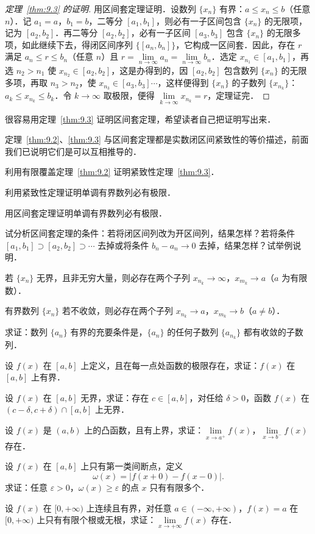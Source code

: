 \begin{proof}[定理~\ref{thm:9.3} 的证明]
用区间套定理证明．设数列 $\{x_n\}$ 有界：$a \leqslant x_n \leqslant b$（任意 $n$）．记 $a_1 = a$，$b_1 = b$，二等分 $[a_1, b_1]$，则必有一子区间包含 $\{x_n\}$ 的无限项，记为 $[a_2, b_2]$．再二等分 $[a_2, b_2]$，必有一子区间 $[a_3, b_3]$ 包含 $\{x_n\}$ 的无限多项，如此继续下去，得闭区间序列 $\{[a_n, b_n]\}$，它构成一区间套．因此，存在 $r$ 满足 $a_n \leqslant r \leqslant b_n$（任意 $n$）且 $r = \lim\limits_{n \to \infty} a_n = \lim\limits_{n \to \infty} b_n$．选定 $x_{n_1} \in [a_1, b_1]$，再选 $n_2 > n_1$ 使 $x_{n_2} \in [a_2, b_2]$，这是办得到的，因 $[a_2, b_2]$ 包含数列 $\{x_n\}$ 的无限多项，再取 $n_3 > n_2$，使 $x_{n_3} \in [a_3, b_3] \cdots$，这样便得到 $\{x_n\}$ 的子数列 $\{x_{n_k}\}$：$a_k \leqslant x_{n_k} \leqslant b_k$．令 $k \to \infty$ 取极限，便得 $\lim\limits_{k \to \infty} x_{n_k} = r$，定理证完．
\end{proof}

很容易用定理~\ref{thm:9.3} 证明区间套定理，希望读者自己把证明写出来．

定理~\ref{thm:9.2}、\ref{thm:9.3} 与区间套定理都是实数闭区间紧致性的等价描述，前面我们已说明它们是可以互相推导的．

\begin{xiti}
\item 利用有限覆盖定理~\ref{thm:9.2} 证明紧致性定理~\ref{thm:9.3}．
\item 利用紧致性定理证明单调有界数列必有极限．
\item 用区间套定理证明单调有界数列必有极限．
\item 试分析区间套定理的条件：若将闭区间列改为开区间列，结果怎样？若将条件 $[a_1, b_1] \supset [a_2, b_2] \supset \cdots$ 去掉或将条件 $b_n - a_n \to 0$ 去掉，结果怎样？试举例说明．
\item 若 $\{x_n\}$ 无界，且非无穷大量，则必存在两个子列 $x_{n_k} \to \infty$，$x_{m_k} \to a$（$a$ 为有限数）．
\item 有界数列 $\{x_n\}$ 若不收敛，则必存在两个子列 $x_{n_k} \to a$，$x_{m_k} \to b$（$a \neq b$）．
\item 求证：数列 $\{a_n\}$ 有界的充要条件是，$\{a_n\}$ 的任何子数列 $\{a_{n_k}\}$ 都有收敛的子数列．
\item 设 $f(x)$ 在 $[a, b]$ 上定义，且在每一点处函数的极限存在，求证：$f(x)$ 在 $[a, b]$ 上有界．
\item 设 $f(x)$ 在 $[a, b]$ 无界，求证：存在 $c \in [a, b]$，对任给 $\delta > 0$，函数 $f(x)$ 在 $(c - \delta, c + \delta) \cap [a, b]$ 上无界．
\item 设 $f(x)$ 是 $(a, b)$ 上的凸函数，且有上界，求证：$\lim\limits_{x \to a^+} f(x)$，$\lim\limits_{x \to b^-} f(x)$ 存在．
\item 设 $f(x)$ 在 $[a, b]$ 上只有第一类间断点，定义
\[
\omega(x) = |f(x+0) - f(x-0)|.
\]
求证：任意 $\varepsilon > 0$，$\omega(x) \geqslant \varepsilon$ 的点 $x$ 只有有限多个．
\item 设 $f(x)$ 在 $[0, +\infty)$ 上连续且有界，对任意 $a \in (-\infty, +\infty)$，$f(x) = a$ 在 $[0, +\infty)$ 上只有有限个根或无根，求证：$\lim\limits_{x \to +\infty} f(x)$ 存在．
\end{xiti}

